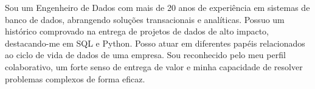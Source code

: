 
\bigskip
\begin{cvparagraph}

Sou um Engenheiro de Dados com mais de 20 anos de experiência em sistemas de banco de dados, abrangendo soluções transacionais e analíticas. Possuo um histórico comprovado na entrega de projetos de dados de alto impacto, destacando-me em SQL e Python. Posso atuar em diferentes papéis relacionados ao ciclo de vida de dados de uma empresa. Sou reconhecido pelo meu perfil colaborativo, um forte senso de entrega de valor e minha capacidade de resolver problemas complexos de forma eficaz.

\end{cvparagraph}